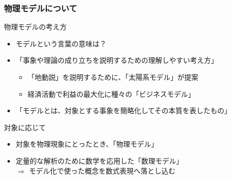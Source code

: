 \documentclass[unicode,12pt,aspectratio=169]{beamer}
\begin{document}
\begin{frame}
	\frametitle{物理モデルについて}
	\begin{block}{物理モデルの考え方}
		\begin{itemize}
			\item モデルという言葉の意味は？
			\item \alert{「事象や理論の成り立ちを説明するための理解しやすい考え方」}
			\begin{itemize}
				\item 「地動説」を説明するために、「太陽系モデル」が提案
				\item 経済活動で利益の最大化に種々の「ビジネスモデル」
			\end{itemize}
			\item \alert{「モデルとは、対象とする事象を簡略化してその本質を表したもの」}
		\end{itemize}
	\end{block}

	\begin{block}{対象に応じて}
		\begin{itemize}
				\item 対象を物理現象にとったとき、「物理モデル」
				\item 定量的な解析のために数学を応用した「数理モデル」\\
				$\Rightarrow$ モデル化で使った概念を数式表現へ落とし込む
			\end{itemize}
	\end{block}
\end{frame}
\end{document}

